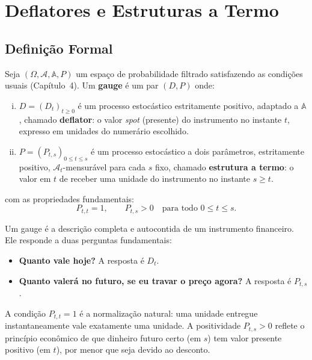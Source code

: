 \section{Deflatores e Estruturas a Termo}

\subsection{Defini\c{c}\~ao Formal}

\begin{defi}[Gauge]\label{def:gauge}
Seja $(\Omega, \mathcal{A}, \mathbb{A}, P)$ um espa\c{c}o de
probabilidade filtrado satisfazendo as condi\c{c}\~oes usuais
(Cap\'itulo~4). Um \textbf{gauge} \'e um par $(D, P)$ onde:
\begin{enumerate}[(i)]
 \item $D = (D_t)_{t \geq 0}$ \'e um processo estoc\'astico
 estritamente positivo, adaptado a $\mathbb{A}$, chamado
 \textbf{deflator}: o valor \textit{spot} (presente) do
 instrumento no instante $t$, expresso em unidades do
 numer\'ario escolhido.
 \item $P = (P_{t,s})_{0 \leq t \leq s}$ \'e um processo estoc\'astico
 a dois par\^ametros, estritamente positivo, $\mathcal{A}_t$-mensur\'avel
 para cada $s$ fixo, chamado \textbf{estrutura a termo}: o valor
 em $t$ de receber uma unidade do instrumento no instante
 $s \geq t$.
\end{enumerate}
com as propriedades fundamentais:
\[
P_{t,t} = 1, \qquad P_{t,s} > 0 \quad \text{para todo } 0 \leq t \leq s.
\]
\end{defi}

\begin{obs}
Um gauge \'e a descri\c{c}\~ao completa e autocontida de um instrumento
financeiro. Ele responde a duas perguntas fundamentais:
\begin{itemize}[nosep]
 \item \textbf{Quanto vale hoje?} A resposta \'e $D_t$.
 \item \textbf{Quanto valer\'a no futuro, se eu travar o pre\c{c}o agora?}
 A resposta \'e $P_{t,s}$.
\end{itemize}
A condi\c{c}\~ao $P_{t,t} = 1$ \'e a normaliza\c{c}\~ao natural: uma
unidade entregue instantaneamente vale exatamente uma unidade. A
positividade $P_{t,s} > 0$ reflete o princ\'ipio econ\^omico de que
dinheiro futuro certo (em $s$) tem valor presente positivo (em $t$), por
menor que seja devido ao desconto.
\end{obs}

